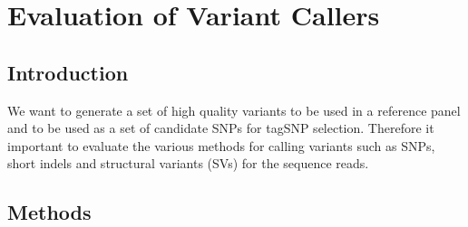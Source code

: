 \section{Evaluation of Variant Callers}
\subsection{Introduction}
We want to generate a set of high quality variants to be used in a reference panel and to be used as a set of candidate SNPs for tagSNP selection. Therefore it important to evaluate the various methods for calling variants such as SNPs, short indels and structural variants (SVs) for the sequence reads.
\subsection{Methods}

